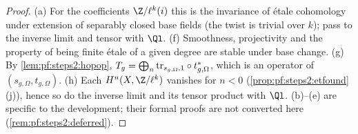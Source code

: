 \begin{proof}
(a) For the coefficients $\Z/\ell^k(i)$ this is the invariance of \'etale cohomology under extension of
separably closed base fields \cite[Exp.~XVI, 1.6]{ArtinGrothendieckVerdier1972} (the twist is trivial
over $k$); pass to the inverse limit and tensor with $\Ql$.
(f) Smoothness, projectivity and the property of being finite \'etale of a given degree are stable
under base change.
(g) By \cref{lem:pf:steps2:hopop}, $T_g=\bigoplus_n\mathrm{tr}_{s_{g,\Omega},1}\circ t_{g,\Omega}^\ast$,
which is an operator of $(s_{g,\Omega},t_{g,\Omega})$.
(h) Each $H^n(X,\Z/\ell^k)$ vanishes for $n<0$ (\cref{prop:pf:steps2:etfound}(j)), hence so do the
inverse limit and its tensor product with $\Ql$.
(b)--(e) are specific to the development; their formal proofs are not converted here
(\cref{rem:pf:steps2:deferred}).
\end{proof}

